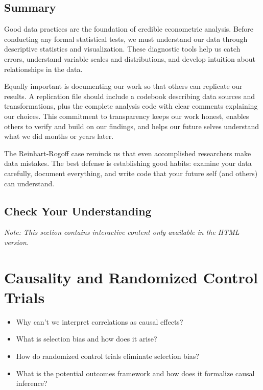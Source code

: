 \documentclass[
  letterpaper,
  DIV=11,
  numbers=noendperiod]{scrreprt}
\providecommand{\tightlist}{%
  \setlength{\itemsep}{0pt}\setlength{\parskip}{0pt}}
\begin{document}
\section{Summary}\label{summary}

Good data practices are the foundation of credible econometric analysis.
Before conducting any formal statistical tests, we must understand our
data through descriptive statistics and visualization. These diagnostic
tools help us catch errors, understand variable scales and
distributions, and develop intuition about relationships in the data.

Equally important is documenting our work so that others can replicate
our results. A replication file should include a codebook describing
data sources and transformations, plus the complete analysis code with
clear comments explaining our choices. This commitment to transparency
keeps our work honest, enables others to verify and build on our
findings, and helps our future selves understand what we did months or
years later.

The Reinhart-Rogoff case reminds us that even accomplished researchers
make data mistakes. The best defense is establishing good habits:
examine your data carefully, document everything, and write code that
your future self (and others) can understand.

\section{Check Your Understanding}\label{check-your-understanding-1}

\emph{Note: This section contains interactive content only available in
the HTML version.}


\chapter{Causality and Randomized Control Trials}\label{sec-rcts}

\begin{tcolorbox}[enhanced jigsaw, arc=.35mm, bottomrule=.15mm, bottomtitle=1mm, breakable, colback=white, colbacktitle=quarto-callout-tip-color!10!white, colframe=quarto-callout-tip-color-frame, coltitle=black, left=2mm, leftrule=.75mm, opacityback=0, opacitybacktitle=0.6, rightrule=.15mm, title=\textcolor{quarto-callout-tip-color}{\faLightbulb}\hspace{0.5em}{\textbf{Key Questions}}, titlerule=0mm, toprule=.15mm, toptitle=1mm]

\begin{itemize}
\tightlist
\item
  Why can't we interpret correlations as causal effects?
\item
  What is selection bias and how does it arise?
\item
  How do randomized control trials eliminate selection bias?
\item
  What is the potential outcomes framework and how does it formalize
  causal inference?
\end{itemize}

\end{tcolorbox}
\end{document}
